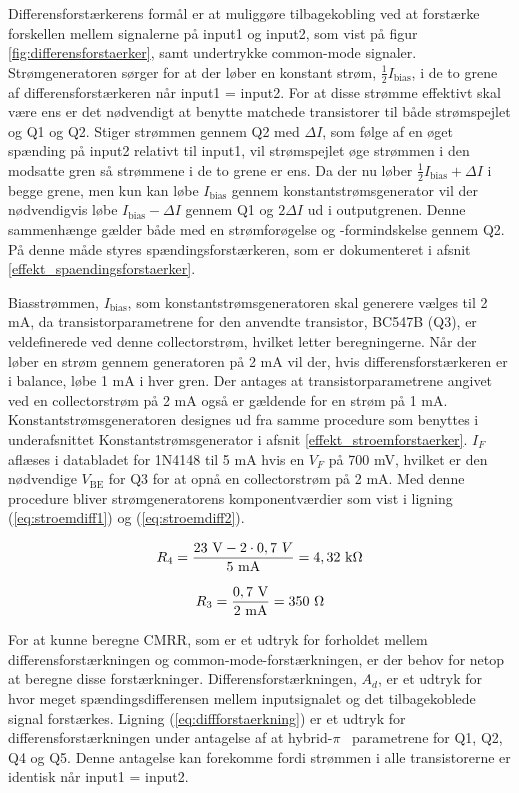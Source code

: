 Differensforstærkerens formål er at muliggøre tilbagekobling ved at forstærke forskellen mellem signalerne på input1 og input2, som vist på figur \ref{fig:differensforstaerker}, samt undertrykke common-mode signaler. Strømgeneratoren sørger for at der løber en konstant strøm, $\frac{1}{2}I_\mathrm{bias}$, i de to grene af differensforstærkeren når input1 = input2. For at disse strømme effektivt skal være ens er det nødvendigt at benytte matchede transistorer til både strømspejlet og Q1 og Q2. Stiger strømmen gennem Q2 med $\Delta I$, som følge af en øget spænding på input2 relativt til input1, vil strømspejlet øge strømmen i den modsatte gren så strømmene i de to grene er ens. Da der nu løber $\frac{1}{2}I_\mathrm{bias} + \Delta I$ i begge grene, men kun kan løbe $I_\mathrm{bias}$ gennem konstantstrømsgenerator vil der nødvendigvis løbe $I_\mathrm{bias} -\Delta I$ gennem Q1 og $2\Delta I$ ud i outputgrenen. Denne sammenhænge gælder både med en strømforøgelse og -formindskelse gennem Q2. På denne måde styres spændingsforstærkeren, som er dokumenteret i afsnit \ref{effekt_spaendingsforstaerker}. 

Biasstrømmen, $I_\mathrm{bias}$, som konstantstrømsgeneratoren skal generere vælges til 2 mA, da transistorparametrene for den anvendte transistor, BC547B (Q3), er veldefinerede ved denne collectorstrøm, hvilket letter beregningerne. Når der løber en strøm gennem generatoren på 2 mA vil der, hvis differensforstærkeren er i balance, løbe 1 mA i hver gren. Der antages at transistorparametrene angivet ved en collectorstrøm på 2 mA også er gældende for en strøm på 1 mA. 
Konstantstrømsgeneratoren designes ud fra samme procedure som benyttes i underafsnittet Konstantstrømsgenerator i afsnit \ref{effekt_stroemforstaerker}. $I_F$ aflæses i databladet for 1N4148 til 5 mA hvis en $V_F$ på 700 mV, hvilket er den nødvendige $V_\mathrm{BE}$ for Q3 for at opnå en collectorstrøm på 2 mA. Med denne procedure bliver strømgeneratorens komponentværdier som vist i ligning (\ref{eq:stroemdiff1}) og (\ref{eq:stroemdiff2}).

\begin{equation}
\label{eq:stroemdiff1}
R_4=\frac{23~\mathrm{V}-2 \cdot 0,7~V}{5~\mathrm{mA}}=4,32~\mathrm{k}\ohm
\end{equation}

\begin{equation}
\label{eq:stroemdiff2}
R_3=\frac{0,7~\mathrm{V}}{2~\mathrm{mA}}=350~\ohm
\end{equation}

For at kunne beregne CMRR, som er et udtryk for forholdet mellem differensforstærkningen og common-mode-forstærkningen, er der behov for netop at beregne disse forstærkninger. 
Differensforstærkningen, $A_d$, er et udtryk for hvor meget spændingsdifferensen mellem inputsignalet og det tilbagekoblede signal forstærkes. Ligning (\ref{eq:diffforstaerkning}) er et udtryk for differensforstærkningen under antagelse af at hybrid-$\pi$~ parametrene for Q1, Q2, Q4 og Q5. Denne antagelse kan forekomme fordi strømmen i alle transistorerne er identisk når input1 = input2.

